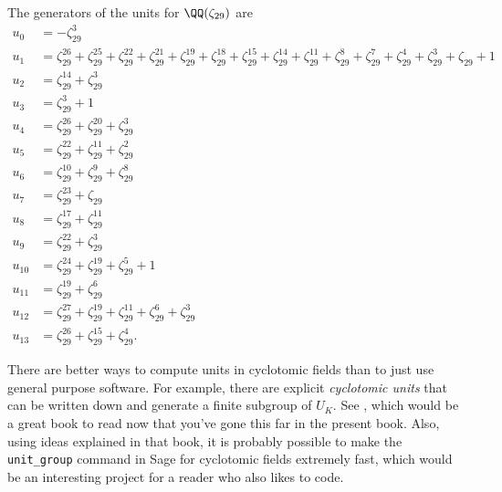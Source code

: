 The generators of the units for $\QQ(\zeta_{29})$ are
\begin{align*}
  u_{0} &= -\zeta_{29}^{3}
  \\
  u_{1} &= \zeta_{29}^{26} + \zeta_{29}^{25} + \zeta_{29}^{22} + \zeta_{29}^{21} + \zeta_{29}^{19} + \zeta_{29}^{18} + \zeta_{29}^{15} + \zeta_{29}^{14} + \zeta_{29}^{11} + \zeta_{29}^{8} + \zeta_{29}^{7} + \zeta_{29}^{4} + \zeta_{29}^{3} + \zeta_{29} + 1
  \\
  u_{2} &= \zeta_{29}^{14} + \zeta_{29}^{3}
  \\
  u_{3} &= \zeta_{29}^{3} + 1
  \\
  u_{4} &= \zeta_{29}^{26} + \zeta_{29}^{20} + \zeta_{29}^{3}
  \\
  u_{5} &= \zeta_{29}^{22} + \zeta_{29}^{11} + \zeta_{29}^{2}
  \\
  u_{6} &= \zeta_{29}^{10} + \zeta_{29}^{9} + \zeta_{29}^{8}
  \\
  u_{7} &= \zeta_{29}^{23} + \zeta_{29}
  \\
  u_{8} &= \zeta_{29}^{17} + \zeta_{29}^{11}
  \\
  u_{9} &= \zeta_{29}^{22} + \zeta_{29}^{3}
  \\
  u_{10} &= \zeta_{29}^{24} + \zeta_{29}^{19} + \zeta_{29}^{5} + 1
  \\
  u_{11} &= \zeta_{29}^{19} + \zeta_{29}^{6}
  \\
  u_{12} &= \zeta_{29}^{27} + \zeta_{29}^{19} + \zeta_{29}^{11} + \zeta_{29}^{6} + \zeta_{29}^{3}
  \\
  u_{13} &= \zeta_{29}^{26} + \zeta_{29}^{15} + \zeta_{29}^{4}.
\end{align*}

There are better ways to compute units in cyclotomic fields than to
just use general purpose software. For example, there are explicit
{\em cyclotomic units} that can be written down and generate a finite
subgroup of $U_K$. See \cite[Ch.~8]{washington:cyclo}, which would be
a great book to read now that you've gone this far in the present book.
Also, using ideas explained in that book, it is probably
possible to make the {\tt unit\_group} command in Sage for cyclotomic
fields extremely fast, which would be an interesting project for a
reader who also likes to code.
